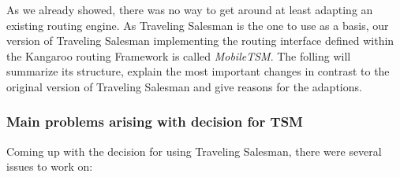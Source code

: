 As we already showed, there was no way to get around at least adapting an existing routing engine. As Traveling Salesman is the one to use as a basis, our version of Traveling Salesman implementing the routing interface defined within the Kangaroo routing Framework is called \emph{MobileTSM}. The folling will summarize its structure, explain the most important changes in contrast to the original version of Traveling Salesman and give reasons for the adaptions.

\subsubsection{Main problems arising with decision for TSM}


Coming up with the decision for using Traveling Salesman, there were several issues to work on:

